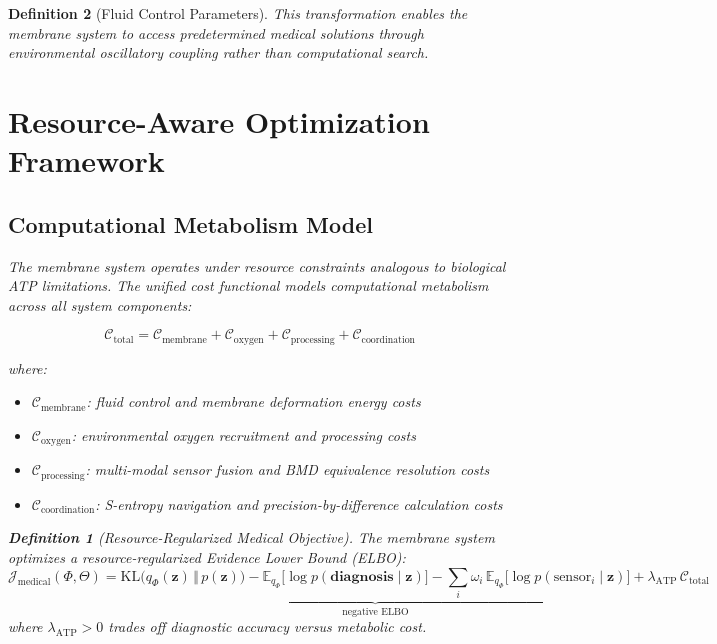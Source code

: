 \documentclass[12pt,a4paper]{article}
\newtheorem{definition}{Definition}
\begin{document}
\begin{definition}[Fluid Control Parameters]
This transformation enables the membrane system to access predetermined medical solutions through environmental oscillatory coupling rather than computational search.

\section{Resource-Aware Optimization Framework}

\subsection{Computational Metabolism Model}

The membrane system operates under resource constraints analogous to biological ATP limitations. The unified cost functional models computational metabolism across all system components:

\begin{equation}
\mathcal{C}_{\text{total}} = \mathcal{C}_{\text{membrane}} + \mathcal{C}_{\text{oxygen}} + \mathcal{C}_{\text{processing}} + \mathcal{C}_{\text{coordination}}
\end{equation}

where:
\begin{itemize}
\item $\mathcal{C}_{\text{membrane}}$: fluid control and membrane deformation energy costs
\item $\mathcal{C}_{\text{oxygen}}$: environmental oxygen recruitment and processing costs
\item $\mathcal{C}_{\text{processing}}$: multi-modal sensor fusion and BMD equivalence resolution costs
\item $\mathcal{C}_{\text{coordination}}$: S-entropy navigation and precision-by-difference calculation costs
\end{itemize}

\begin{definition}[Resource-Regularized Medical Objective]
The membrane system optimizes a resource-regularized Evidence Lower Bound (ELBO):
\begin{equation}
\mathcal{J}_{\text{medical}}(\Phi,\Theta) = \underbrace{\mathrm{KL}\bigl(q_{\Phi}(\mathbf{z})\,\Vert\, p(\mathbf{z})\bigr) - \mathbb{E}_{q_{\Phi}}\bigl[\log p(\mathbf{diagnosis}\mid \mathbf{z})\bigr] - \sum_{i} \omega_i\, \mathbb{E}_{q_{\Phi}}\bigl[\log p(\text{sensor}_i \mid \mathbf{z})\bigr]}_{\text{negative ELBO}} + \lambda_{\text{ATP}} \, \mathcal{C}_{\text{total}}
\end{equation}
where $\lambda_{\text{ATP}} > 0$ trades off diagnostic accuracy versus metabolic cost.
\end{definition}


\end{definition}
\end{document}
